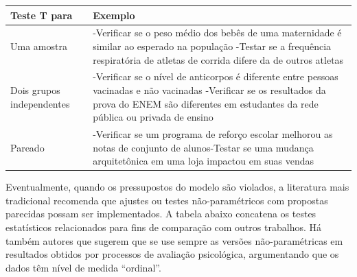 \documentclass[
]{book}
\begin{document}
\begin{longtable}[]{@{}ll@{}}
\toprule
\begin{minipage}[b]{0.47\columnwidth}\raggedright
Teste T para\strut
\end{minipage} & \begin{minipage}[b]{0.47\columnwidth}\raggedright
Exemplo\strut
\end{minipage}\tabularnewline
\midrule
\endhead
\begin{minipage}[t]{0.47\columnwidth}\raggedright
Uma amostra\strut
\end{minipage} & \begin{minipage}[t]{0.47\columnwidth}\raggedright
-Verificar se o peso médio dos bebês de uma maternidade é similar ao esperado na população -Testar se a frequência respiratória de atletas de corrida difere da de outros atletas\strut
\end{minipage}\tabularnewline
\begin{minipage}[t]{0.47\columnwidth}\raggedright
Dois grupos independentes\strut
\end{minipage} & \begin{minipage}[t]{0.47\columnwidth}\raggedright
-Verificar se o nível de anticorpos é diferente entre pessoas vacinadas e não vacinadas -Verificar se os resultados da prova do ENEM são diferentes em estudantes da rede pública ou privada de ensino\strut
\end{minipage}\tabularnewline
\begin{minipage}[t]{0.47\columnwidth}\raggedright
Pareado\strut
\end{minipage} & \begin{minipage}[t]{0.47\columnwidth}\raggedright
-Verificar se um programa de reforço escolar melhorou as notas de conjunto de alunos-Testar se uma mudança arquitetônica em uma loja impactou em suas vendas\strut
\end{minipage}\tabularnewline
\bottomrule
\end{longtable}

Eventualmente, quando os pressupostos do modelo são violados, a literatura mais tradicional recomenda que ajustes ou testes não-paramétricos com propostas parecidas possam ser implementados. A tabela abaixo concatena os testes estatísticos relacionados para fins de comparação com outros trabalhos. Há também autores que sugerem que se use sempre as versões não-paramétricas em resultados obtidos por processos de avaliação psicológica, argumentando que os dados têm nível de medida ``ordinal''.
\end{document}
